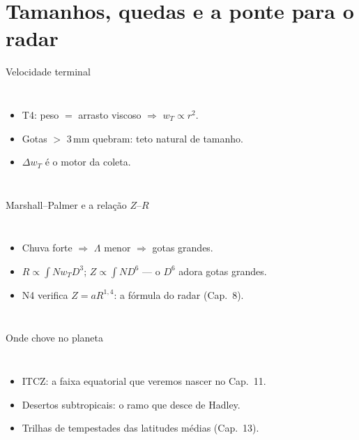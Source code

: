\documentclass[aspectratio=169,11pt]{beamer}
\begin{document}
\section{Tamanhos, quedas e a ponte para o radar}

\begin{frame}{Velocidade terminal}
  \begin{columns}
    \vspace{0.4em}
    \begin{itemize}
      \item T4: peso $=$ arrasto viscoso $\Rightarrow$
            $w_T \propto r^2$.
      \item Gotas $>$ 3\,mm quebram: teto natural de tamanho.
      \item $\Delta w_T$ é o motor da coleta.
    \end{itemize}
  \end{columns}
\end{frame}

\begin{frame}{Marshall--Palmer e a relação $Z$--$R$}
  \begin{columns}
    \vspace{0.4em}
    \begin{itemize}
      \item Chuva forte $\Rightarrow$ $\Lambda$ menor $\Rightarrow$
            gotas grandes.
      \item $R \propto \int N w_T D^3$;\quad
            $Z \propto \int N D^6$ — o $D^6$ adora gotas grandes.
      \item N4 verifica $Z = aR^{1{,}4}$: a fórmula do radar (Cap.~8).
    \end{itemize}
  \end{columns}
\end{frame}

\begin{frame}{Onde chove no planeta}
  \begin{columns}
    \begin{itemize}
      \item ITCZ: a faixa equatorial que veremos nascer no Cap.~11.
      \item Desertos subtropicais: o ramo que desce de Hadley.
      \item Trilhas de tempestades das latitudes médias (Cap.~13).
    \end{itemize}
  \end{columns}
\end{frame}
\end{document}
